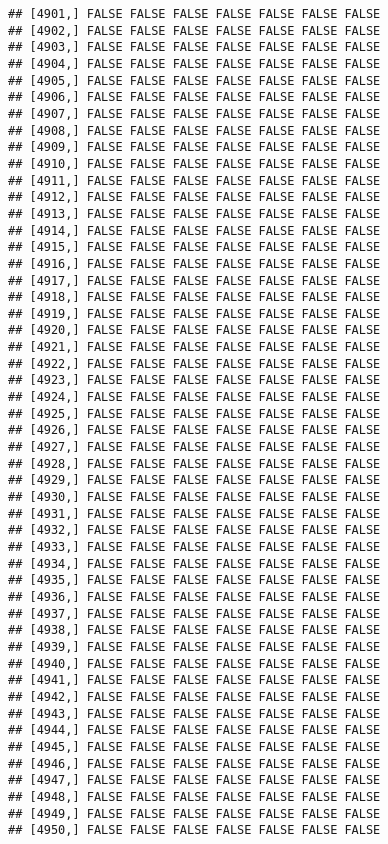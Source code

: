 \documentclass[
]{article}
\begin{document}
\begin{verbatim}
## [4901,] FALSE FALSE FALSE FALSE FALSE FALSE FALSE
## [4902,] FALSE FALSE FALSE FALSE FALSE FALSE FALSE
## [4903,] FALSE FALSE FALSE FALSE FALSE FALSE FALSE
## [4904,] FALSE FALSE FALSE FALSE FALSE FALSE FALSE
## [4905,] FALSE FALSE FALSE FALSE FALSE FALSE FALSE
## [4906,] FALSE FALSE FALSE FALSE FALSE FALSE FALSE
## [4907,] FALSE FALSE FALSE FALSE FALSE FALSE FALSE
## [4908,] FALSE FALSE FALSE FALSE FALSE FALSE FALSE
## [4909,] FALSE FALSE FALSE FALSE FALSE FALSE FALSE
## [4910,] FALSE FALSE FALSE FALSE FALSE FALSE FALSE
## [4911,] FALSE FALSE FALSE FALSE FALSE FALSE FALSE
## [4912,] FALSE FALSE FALSE FALSE FALSE FALSE FALSE
## [4913,] FALSE FALSE FALSE FALSE FALSE FALSE FALSE
## [4914,] FALSE FALSE FALSE FALSE FALSE FALSE FALSE
## [4915,] FALSE FALSE FALSE FALSE FALSE FALSE FALSE
## [4916,] FALSE FALSE FALSE FALSE FALSE FALSE FALSE
## [4917,] FALSE FALSE FALSE FALSE FALSE FALSE FALSE
## [4918,] FALSE FALSE FALSE FALSE FALSE FALSE FALSE
## [4919,] FALSE FALSE FALSE FALSE FALSE FALSE FALSE
## [4920,] FALSE FALSE FALSE FALSE FALSE FALSE FALSE
## [4921,] FALSE FALSE FALSE FALSE FALSE FALSE FALSE
## [4922,] FALSE FALSE FALSE FALSE FALSE FALSE FALSE
## [4923,] FALSE FALSE FALSE FALSE FALSE FALSE FALSE
## [4924,] FALSE FALSE FALSE FALSE FALSE FALSE FALSE
## [4925,] FALSE FALSE FALSE FALSE FALSE FALSE FALSE
## [4926,] FALSE FALSE FALSE FALSE FALSE FALSE FALSE
## [4927,] FALSE FALSE FALSE FALSE FALSE FALSE FALSE
## [4928,] FALSE FALSE FALSE FALSE FALSE FALSE FALSE
## [4929,] FALSE FALSE FALSE FALSE FALSE FALSE FALSE
## [4930,] FALSE FALSE FALSE FALSE FALSE FALSE FALSE
## [4931,] FALSE FALSE FALSE FALSE FALSE FALSE FALSE
## [4932,] FALSE FALSE FALSE FALSE FALSE FALSE FALSE
## [4933,] FALSE FALSE FALSE FALSE FALSE FALSE FALSE
## [4934,] FALSE FALSE FALSE FALSE FALSE FALSE FALSE
## [4935,] FALSE FALSE FALSE FALSE FALSE FALSE FALSE
## [4936,] FALSE FALSE FALSE FALSE FALSE FALSE FALSE
## [4937,] FALSE FALSE FALSE FALSE FALSE FALSE FALSE
## [4938,] FALSE FALSE FALSE FALSE FALSE FALSE FALSE
## [4939,] FALSE FALSE FALSE FALSE FALSE FALSE FALSE
## [4940,] FALSE FALSE FALSE FALSE FALSE FALSE FALSE
## [4941,] FALSE FALSE FALSE FALSE FALSE FALSE FALSE
## [4942,] FALSE FALSE FALSE FALSE FALSE FALSE FALSE
## [4943,] FALSE FALSE FALSE FALSE FALSE FALSE FALSE
## [4944,] FALSE FALSE FALSE FALSE FALSE FALSE FALSE
## [4945,] FALSE FALSE FALSE FALSE FALSE FALSE FALSE
## [4946,] FALSE FALSE FALSE FALSE FALSE FALSE FALSE
## [4947,] FALSE FALSE FALSE FALSE FALSE FALSE FALSE
## [4948,] FALSE FALSE FALSE FALSE FALSE FALSE FALSE
## [4949,] FALSE FALSE FALSE FALSE FALSE FALSE FALSE
## [4950,] FALSE FALSE FALSE FALSE FALSE FALSE FALSE

\end{verbatim}
\end{document}
